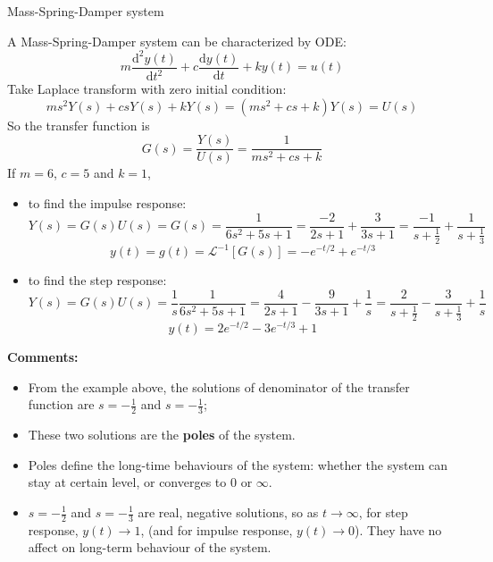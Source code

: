 \begin{ex}{Mass-Spring-Damper system}
    \begin{figure}[H] 
        \centering
        
    \end{figure}
    A Mass-Spring-Damper system can be characterized by ODE:
    \[ m\frac{\mathrm{d}^{2}y(t)}{\mathrm{d}t^{2}}+c\frac{\mathrm{d}y(t)}{\mathrm{d}t}+ky(t)=u(t) \]
    Take Laplace transform with zero initial condition:
    \[ ms^{2}Y(s)+csY(s)+kY(s)=(ms^{2}+cs+k)Y(s)=U(s) \]
    So the transfer function is 
    \[ G(s)=\frac{Y(s)}{U(s)}= \frac{1}{ms^{2}+cs+k} \]
    If $m=6$, $c=5$ and $k=1$, 
    \begin{itemize}
    \item to find the impulse response:
    \[ 
    Y(s) = G(s)U(s) = G(s) 
    = \frac{1}{6s^{2}+5s+1} 
    = \frac{-2}{2s+1}+\frac{3}{3s+1}= \frac{-1}{s+\frac{1}{2}}+\frac{1}{s+\frac{1}{3}} 
    \]
    \[ 
    y(t) = g(t) 
    = \mathcal{L}^{-1} [G(s)] 
    = -e^{-t/2}+e^{-t/3} 
    \]
    
    \item to find the step response:
    \[
    Y(s) = G(s)U(s) = \frac{1}{s}\frac{1}{6s^{2}+5s+1} 
    = \frac{4}{2s+1}-\frac{9}{3s+1} +\frac{1}{s} 
    = \frac{2}{s+\frac{1}{2}}-\frac{3}{s+\frac{1}{3}} +\frac{1}{s} \]
    \[ y(t) = 2e^{-t/2}-3e^{-t/3} +1 \]
    \end{itemize}
    
    \textbf{Comments:}
    \begin{itemize}
     \item From the example above, the solutions of denominator of the transfer function are $s = -\frac{1}{2}$ and $s = -\frac{1}{3}$;
     
     \item These two solutions are the \textbf{poles} of the system. 
     \item Poles define the long-time behaviours of the system: whether the system can stay at certain level, or converges to 0 or $\infty$.
     
     \item $s = -\frac{1}{2}$ and $s = -\frac{1}{3}$ are real, negative solutions, so as $t\to \infty$, 
     for step response,  $y(t) \to 1$, (and for impulse response, $y(t) \to 0$). They have no affect on long-term behaviour of the system.
    \end{itemize}
\end{ex}

